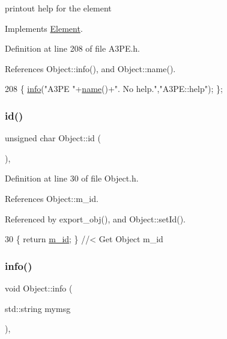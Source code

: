 printout help for the element 

Implements \hyperlink{classElement_a32c0de27acb08e17251cef88c3e9303a}{Element}.



Definition at line 208 of file A3\+P\+E.\+h.



References Object\+::info(), and Object\+::name().


\begin{DoxyCode}
208 \{ \hyperlink{classObject_a644fd329ea4cb85f54fa6846484b84a8}{info}(\textcolor{stringliteral}{"A3PE "}+\hyperlink{classObject_a300f4c05dd468c7bb8b3c968868443c1}{name}()+\textcolor{stringliteral}{". No help."},\textcolor{stringliteral}{"A3PE::help"}); \};
\end{DoxyCode}
\mbox{\label{classObject_af99145335cc61ff6e2798ea17db009d2}} 
\subsubsection{\texorpdfstring{id()}{id()}}
{\footnotesize\ttfamily unsigned char Object\+::id (\begin{DoxyParamCaption}{ }\end{DoxyParamCaption})\hspace{0.3cm}{\ttfamily [inline]}, {\ttfamily [inherited]}}



Definition at line 30 of file Object.\+h.



References Object\+::m\+\_\+id.



Referenced by export\+\_\+obj(), and Object\+::set\+Id().


\begin{DoxyCode}
30 \{ \textcolor{keywordflow}{return} \hyperlink{classObject_aca74b9dbfed7b5556ea2d56c65b6b6b0}{m\_id};         \} \textcolor{comment}{//< Get Object m\_id }
\end{DoxyCode}
\mbox{\label{classObject_a644fd329ea4cb85f54fa6846484b84a8}} 
\subsubsection{\texorpdfstring{info()}{info()}\hspace{0.1cm}{\footnotesize\ttfamily [1/2]}}
{\footnotesize\ttfamily void Object\+::info (\begin{DoxyParamCaption}\item[{std\+::string}]{mymsg }\end{DoxyParamCaption})\hspace{0.3cm}{\ttfamily [inline]}, {\ttfamily [inherited]}}



